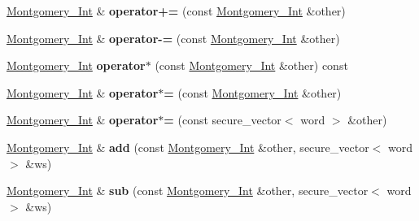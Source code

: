 \begin{DoxyCompactItemize}
\hyperlink{class_botan_1_1_montgomery___int}{Montgomery\+\_\+\+Int} \& {\bfseries operator+=} (const \hyperlink{class_botan_1_1_montgomery___int}{Montgomery\+\_\+\+Int} \&other)
\item 
\mbox{\label{class_botan_1_1_montgomery___int_a95e5d18c2cd865ecb2d43440588b5305}} 
\hyperlink{class_botan_1_1_montgomery___int}{Montgomery\+\_\+\+Int} \& {\bfseries operator-\/=} (const \hyperlink{class_botan_1_1_montgomery___int}{Montgomery\+\_\+\+Int} \&other)
\item 
\mbox{\label{class_botan_1_1_montgomery___int_a772e1acf4bd278ac8c2090d1bf379283}} 
\hyperlink{class_botan_1_1_montgomery___int}{Montgomery\+\_\+\+Int} {\bfseries operator$\ast$} (const \hyperlink{class_botan_1_1_montgomery___int}{Montgomery\+\_\+\+Int} \&other) const
\item 
\mbox{\label{class_botan_1_1_montgomery___int_ac72a6b0ed493f2b2090d21b32521e225}} 
\hyperlink{class_botan_1_1_montgomery___int}{Montgomery\+\_\+\+Int} \& {\bfseries operator$\ast$=} (const \hyperlink{class_botan_1_1_montgomery___int}{Montgomery\+\_\+\+Int} \&other)
\item 
\mbox{\label{class_botan_1_1_montgomery___int_ad841bd88c3614dd060e5c00629a2314c}} 
\hyperlink{class_botan_1_1_montgomery___int}{Montgomery\+\_\+\+Int} \& {\bfseries operator$\ast$=} (const secure\+\_\+vector$<$ word $>$ \&other)
\item 
\mbox{\label{class_botan_1_1_montgomery___int_a78c61bd0b9550f8d042e946423b4e099}} 
\hyperlink{class_botan_1_1_montgomery___int}{Montgomery\+\_\+\+Int} \& {\bfseries add} (const \hyperlink{class_botan_1_1_montgomery___int}{Montgomery\+\_\+\+Int} \&other, secure\+\_\+vector$<$ word $>$ \&ws)
\item 
\mbox{\label{class_botan_1_1_montgomery___int_a314a1768a12f35ffea435c44572320b2}} 
\hyperlink{class_botan_1_1_montgomery___int}{Montgomery\+\_\+\+Int} \& {\bfseries sub} (const \hyperlink{class_botan_1_1_montgomery___int}{Montgomery\+\_\+\+Int} \&other, secure\+\_\+vector$<$ word $>$ \&ws)
\item 
\mbox{\label{class_botan_1_1_montgomery___int_af6d0103096d488d5b9a9bb02d6dc7c39}} 

\end{DoxyCompactItemize}
